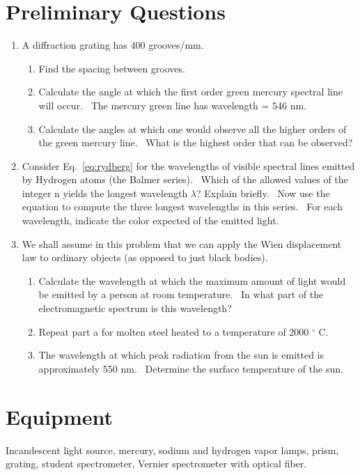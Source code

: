 \documentclass{article}
\begin{document}
\section{Preliminary Questions}
\begin{enumerate}
\item A diffraction grating has 400 grooves/mm.
\begin{enumerate}
\item Find the spacing between grooves.
\item Calculate the angle at which the first order green mercury
spectral line will occur. \ The mercury green line has wavelength = 546
nm.
\item Calculate the angles at which one would observe all the higher
orders of the green mercury line. \ What is the highest order that can be
observed?
\end{enumerate}

\item Consider Eq.~\ref{eq:rydberg} for the wavelengths of visible spectral lines
emitted by Hydrogen atoms (the Balmer series). \ Which of the allowed
values of the integer n yields the longest wavelength ${\lambda}$?
Explain briefly. \ Now use the equation to compute the three longest
wavelengths in this series. \ For each wavelength, indicate the color
expected of the emitted light.

\item We shall assume in this problem that we can apply the Wien
displacement law to ordinary objects (as opposed to just black
bodies).
\begin{enumerate}
\item Calculate the wavelength at which the maximum amount of light
would be emitted by a person at room temperature. \ In what part of the
electromagnetic spectrum is this wavelength?
\item Repeat part a for molten steel heated to a temperature of 2000
${}^\circ$ C.
\item The wavelength at which peak radiation from the sun is emitted is
approximately 550 nm. \ Determine the surface temperature of the sun.
\end{enumerate}
\end{enumerate}

\section{Equipment}
Incandescent light source, mercury, sodium and hydrogen
vapor lamps, prism, grating, student spectrometer, Vernier spectrometer with optical fiber.
\end{document}
